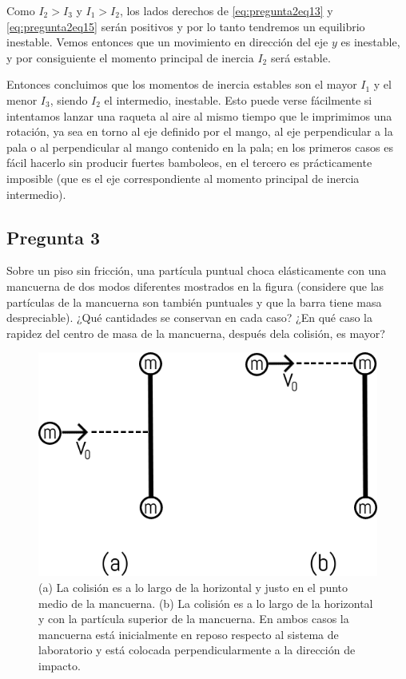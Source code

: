 \documentclass[a4paper,10pt]{article}
\numberwithin{equation}{section}
\begin{document}
Como $I_2 > I_3$ y $I_1 > I_2$, los lados derechos de \eqref{eq:pregunta2eq13} y 
\eqref{eq:pregunta2eq15} serán positivos y por lo tanto tendremos un equilibrio 
inestable. Vemos entonces que un movimiento en dirección del eje $y$ es inestable, 
y por consiguiente el momento principal de inercia $I_2$ será estable. 

\vspace{.3cm}

Entonces concluimos que los momentos de inercia estables son el mayor $I_1$ y 
el menor $I_3$, siendo $I_2$ el intermedio, inestable. Esto puede verse fácilmente 
si intentamos lanzar una raqueta al aire al mismo tiempo que le imprimimos una 
rotación, ya sea en torno al eje definido por el mango, al eje perpendicular a la 
pala o al perpendicular al mango contenido en la pala; en los primeros casos es 
fácil hacerlo sin producir fuertes bamboleos, en el tercero es prácticamente 
imposible (que es el eje correspondiente al momento principal de inercia intermedio).

\subsection{Pregunta 3}

Sobre un piso sin fricción, una partícula puntual choca elásticamente con una mancuerna de dos 
modos diferentes mostrados en la figura (considere que las partículas de la mancuerna son también
puntuales y que la barra tiene masa despreciable). ¿Qué cantidades se conservan en cada caso? 
¿En qué caso la rapidez del centro de masa de la mancuerna, después dela colisión, es mayor?

\vspace{.3cm}

\begin{figure}[H]
 \center 
 \includegraphics[scale=0.4]{fig1}
 \caption{(a) La colisión es a lo largo de la horizontal y justo en el punto medio 
 de la mancuerna. (b) La colisión es a lo largo de la horizontal y con la partícula 
 superior de la mancuerna. En ambos casos la mancuerna está inicialmente en reposo 
 respecto al sistema de laboratorio y está colocada perpendicularmente a la dirección 
 de impacto.}
\end{figure}
\end{document}
